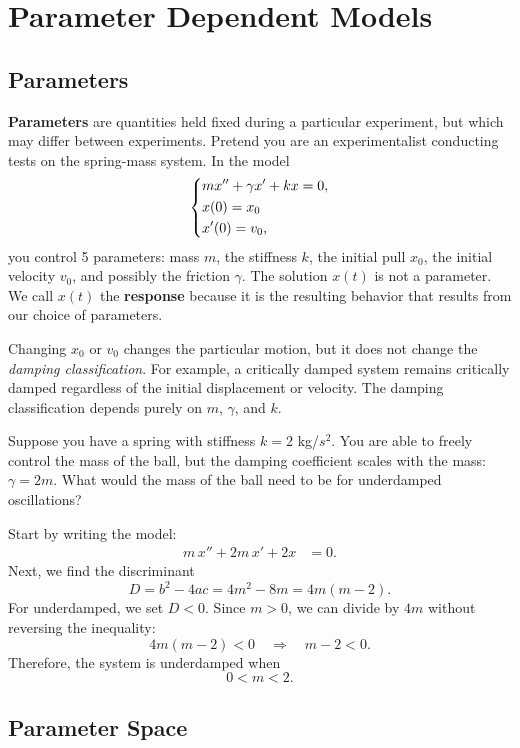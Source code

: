 \documentclass[10pt,letterpaper]{article}
\begin{document}
\section{Parameter Dependent Models}

\subsection{Parameters}
\textbf{Parameters} are quantities held fixed during a particular
experiment, but which may differ between experiments. Pretend you are an experimentalist conducting tests on the spring-mass system. In the model
\[
\begin{dcases}
m x'' + \gamma  x' + kx = 0,\\
x(0)=x_0\\
x'(0)=v_0,
\end{dcases}
\]
you control 5 parameters:  mass $m$, the stiffness $k$, the initial pull $x_0$, the initial velocity $v_0$, and possibly the friction $\gamma$. The solution $x(t)$ is not a parameter. We call $x(t)$ the \textbf{response} because it is the resulting behavior that results from our choice of parameters.

Changing $x_0$ or $v_0$ changes the particular motion, but it
does not change the \textit{damping classification}. For example,
a critically damped system remains critically damped regardless
of the initial displacement or velocity. The damping classification depends purely on $m$, $\gamma$, and $k$.

\begin{example}[2]{    
Suppose you have a spring with stiffness $k=2$ kg/$s^2$. You are able to freely control the mass of the ball, but the damping coefficient scales with the mass: $\gamma=2m$. What would the mass of the ball need to be for underdamped oscillations? 
}

Start by writing the model:
\begin{align*}
    m\,x'' + 2m\, x' + 2x &= 0.
\end{align*}
Next, we find the discriminant 
$$
D = b^2-4ac = 4m^2 -8m = 4m(m-2).
$$
For underdamped, we set $D<0$. Since $m>0$, we can divide by $4m$ without reversing
the inequality:
\[
4m(m-2)<0
\quad\Rightarrow\quad
m-2<0.
\]
Therefore, the system is underdamped when
\[
\boxed{0<m<2.}
\]
\end{example}

\subsection{Parameter Space}
\end{document}
